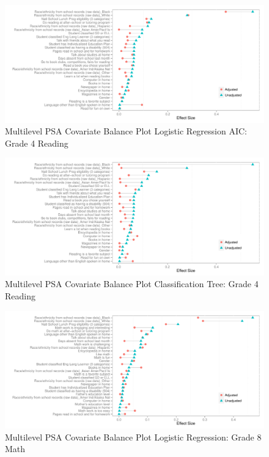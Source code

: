 \begin{figure}[h!]
\begin{center}
\includegraphics[width=\textwidth]{../Figures2009/g4read-mlpsa-lrAIC-balance.pdf}
\caption{Multilevel PSA Covariate Balance Plot Logistic Regression AIC: Grade 4 Reading}
\end{center}
\end{figure}

\begin{figure}[h!]
\begin{center}
\includegraphics[width=\textwidth]{../Figures2009/g4read-mlpsa-ctree-balance.pdf}
\caption{Multilevel PSA Covariate Balance Plot Classification Tree: Grade 4 Reading}
\end{center}
\end{figure}

\begin{figure}[h!]
\begin{center}
\includegraphics[width=\textwidth]{../Figures2009/g8math-mlpsa-lr-balance.pdf}
\caption{Multilevel PSA Covariate Balance Plot Logistic Regression: Grade 8 Math}
\end{center}
\end{figure}

